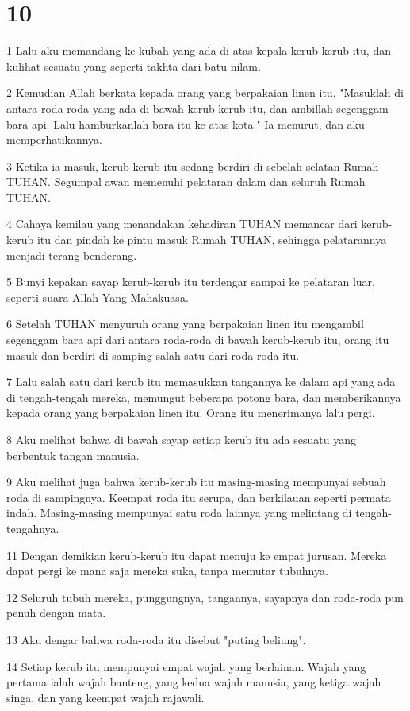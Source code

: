\chapter{10}

\par 1 Lalu aku memandang ke kubah yang ada di atas kepala kerub-kerub itu, dan kulihat sesuatu yang seperti takhta dari batu nilam.
\par 2 Kemudian Allah berkata kepada orang yang berpakaian linen itu, "Masuklah di antara roda-roda yang ada di bawah kerub-kerub itu, dan ambillah segenggam bara api. Lalu hamburkanlah bara itu ke atas kota." Ia menurut, dan aku memperhatikannya.
\par 3 Ketika ia masuk, kerub-kerub itu sedang berdiri di sebelah selatan Rumah TUHAN. Segumpal awan memenuhi pelataran dalam dan seluruh Rumah TUHAN.
\par 4 Cahaya kemilau yang menandakan kehadiran TUHAN memancar dari kerub-kerub itu dan pindah ke pintu masuk Rumah TUHAN, sehingga pelatarannya menjadi terang-benderang.
\par 5 Bunyi kepakan sayap kerub-kerub itu terdengar sampai ke pelataran luar, seperti suara Allah Yang Mahakuasa.
\par 6 Setelah TUHAN menyuruh orang yang berpakaian linen itu mengambil segenggam bara api dari antara roda-roda di bawah kerub-kerub itu, orang itu masuk dan berdiri di samping salah satu dari roda-roda itu.
\par 7 Lalu salah satu dari kerub itu memasukkan tangannya ke dalam api yang ada di tengah-tengah mereka, memungut beberapa potong bara, dan memberikannya kepada orang yang berpakaian linen itu. Orang itu menerimanya lalu pergi.
\par 8 Aku melihat bahwa di bawah sayap setiap kerub itu ada sesuatu yang berbentuk tangan manusia.
\par 9 Aku melihat juga bahwa kerub-kerub itu masing-masing mempunyai sebuah roda di sampingnya. Keempat roda itu serupa, dan berkilauan seperti permata indah. Masing-masing mempunyai satu roda lainnya yang melintang di tengah-tengahnya.
\par 11 Dengan demikian kerub-kerub itu dapat menuju ke empat jurusan. Mereka dapat pergi ke mana saja mereka suka, tanpa memutar tubuhnya.
\par 12 Seluruh tubuh mereka, punggungnya, tangannya, sayapnya dan roda-roda pun penuh dengan mata.
\par 13 Aku dengar bahwa roda-roda itu disebut "puting beliung".
\par 14 Setiap kerub itu mempunyai empat wajah yang berlainan. Wajah yang pertama ialah wajah banteng, yang kedua wajah manusia, yang ketiga wajah singa, dan yang keempat wajah rajawali.
